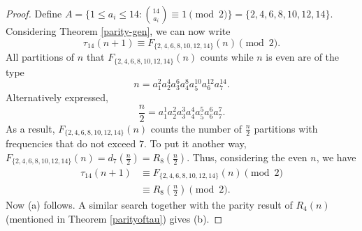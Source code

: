 \documentclass[10pt]{article}
\theoremstyle{definition}
\begin{document}
\begin{proof}
Define $A=\{1\leq a_i\leq 14:{14\choose{a_i}}\equiv 1\pmod{2}\}=\{2,4,6,8,10,12,14\}$.
Considering Theorem \ref{parity-gen}, we can now write
\begin{equation*}\label{tau14mod2}
\tau_{14}(n+1)\equiv F_{\{2,4,6,8,10,12,14\}}(n)\pmod{2}.
\end{equation*}
All partitions of $n$ that $F_{\{2,4,6,8,10,12,14\}}(n)$ counts while $n$ is even are of the type
\[n=a_1^2a_2^4a_3^6a_4^8a_5^{10}a_6^{12}a_7^{14}.
\]
Alternatively expressed,
\[\frac{n}{2}=a_1^1a_2^2a_3^3a_4^4a_5^5a_6^6a_7^7.
\]
As a result, $F_{\{2,4,6,8,10,12,14\}}(n)$ counts the number of $\frac{n}{2}$ partitions with frequencies that do not exceed $7$. To put it another way, $F_{\{2,4,6,8,10,12,14\}}(n)=d_7(\frac{n}{2})=R_8(\frac{n}{2})$. Thus, considering the even $n$, we have
\begin{align*}
\tau_{14}(n+1)& \equiv F_{\{2,4,6,8,10,12,14\}}(n)\pmod{2}\\
& \equiv R_8\left(\frac{n}{2}\right)\pmod{2}.
\end{align*}
Now (a) follows.
A similar search together with the parity result of $R_4(n)$ (mentioned in Theorem \ref{parityoftau}) gives (b).
\end{proof}
\end{document}
